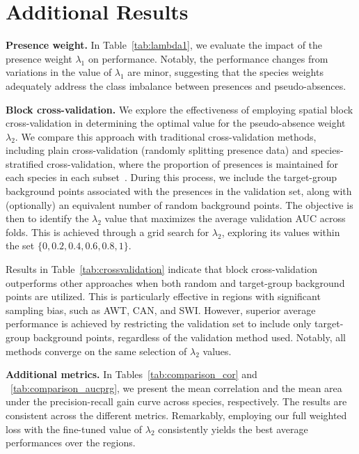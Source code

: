 \documentclass[3p,preprint,12pt]{elsarticle}
\begin{document}
\section{Additional Results}
\label{sec:resultsappendix}

\textbf{Presence weight.} In Table~\ref{tab:lambda1}, we evaluate the impact of the presence weight $\lambda_1$ on performance. Notably, the performance changes from variations in the value of $\lambda_1$ are minor, suggesting that the species weights adequately address the class imbalance between presences and pseudo-absences.



\textbf{Block cross-validation.} We explore the effectiveness of employing spatial block cross-validation in determining the optimal value for the pseudo-absence weight $\lambda_2$. We compare this approach with traditional cross-validation methods, including plain cross-validation (randomly splitting presence data) and species-stratified cross-validation, where the proportion of presences is maintained for each species in each subset~\citep{sechidis2011stratification}. During this process, we include the target-group background points associated with the presences in the validation set, along with (optionally) an equivalent number of random background points. The objective is then to identify the $\lambda_2$ value that maximizes the average validation AUC across folds. This is achieved through a grid search for $\lambda_2$, exploring its values within the set $\{0, 0.2, 0.4, 0.6, 0.8, 1\}$.

Results in Table~\ref{tab:crossvalidation} indicate that block cross-validation outperforms other approaches when both random and target-group background points are utilized. This is particularly effective in regions with significant sampling bias, such as AWT, CAN, and SWI. However, superior average performance is achieved by restricting the validation set to include only target-group background points, regardless of the validation method used. Notably, all methods converge on the same selection of $\lambda_2$ values.



\textbf{Additional metrics.} In Tables~\ref{tab:comparison_cor} and ~\ref{tab:comparison_aucprg}, we present the mean correlation and the mean area under the precision-recall gain curve across species, respectively. The results are consistent across the different metrics. Remarkably, employing our full weighted loss with the fine-tuned value of $\lambda_2$ consistently yields the best average performances over the regions.


\end{document}
